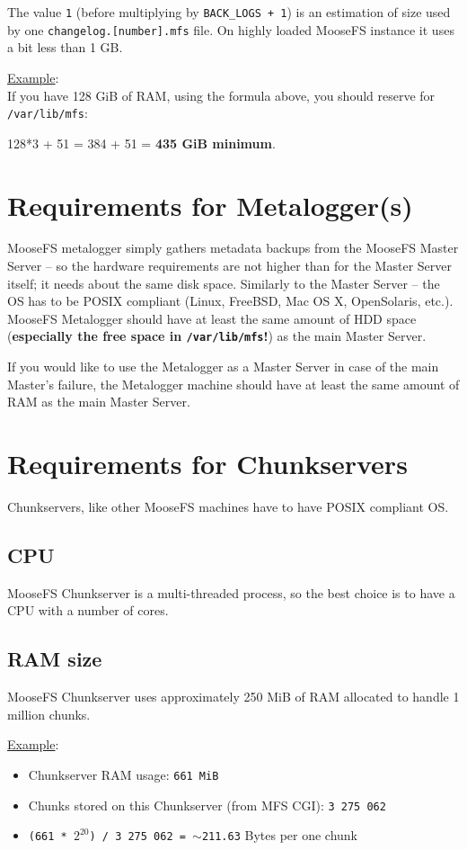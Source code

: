 \documentclass[a4paper,11pt,english]{report}
\def\code#1{\texttt{#1}}
\begin{document}
			The value \code{1} (before multiplying by \code{BACK\_LOGS + 1}) is an estimation of size used by one \code{changelog.[number].mfs} file. On highly loaded MooseFS instance it uses a bit less than 1 GB.
			
			\underline{Example}: \\
			If you have 128 GiB of RAM, using the formula above, you should reserve for \code{/var/lib/mfs}:
			
			128*3 + 51 = 384 + 51 = \textbf{435 GiB minimum}.
		
		\section{Requirements for Metalogger(s)}
		MooseFS metalogger simply gathers metadata backups from the MooseFS Master Server -- so the hardware requirements are not higher than for the Master Server itself; it needs about the same disk space. Similarly to the Master Server -- the OS has to be POSIX compliant (Linux, FreeBSD, Mac OS X, OpenSolaris, etc.).\\
		
		MooseFS Metalogger should have at least the same amount of HDD space (\textbf{especially the free space in \code{/var/lib/mfs}!}) as the main Master Server.
		
		If you would like to use the Metalogger as a Master Server in case of the main Master's failure, the Metalogger machine should have at least the same amount of RAM as the main Master Server.

		\section{Requirements for Chunkservers}
		Chunkservers, like other MooseFS machines have to have POSIX compliant OS.
		
			\subsection{CPU}
			MooseFS Chunkserver is a multi-threaded process, so the best choice is to have a CPU with a number of cores.
			
			\subsection{RAM size}
			MooseFS Chunkserver uses approximately 250 MiB of RAM allocated to handle 1 million chunks.
			
			\underline{Example}:
			\begin{itemize}
				\item Chunkserver RAM usage: \code{661 MiB}
				\item Chunks stored on this Chunkserver (from MFS CGI): \code{3 275 062}
				\item \code{(661 * $2^{20}$) / 3 275 062 = $\sim$211.63} Bytes per one chunk
			\end{itemize}
			
\end{document}
